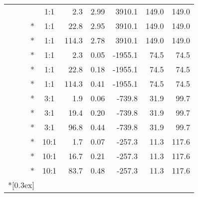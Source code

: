 \documentclass{article}
\begin{document}
\begin{center}
\begin{longtable}{rcrrrrr}
& 1:1   & 2.3   & 2.99 & 3910.1  & 149.0 & 149.0\\*
& 1:1   & 22.8  & 2.95 & 3910.1  & 149.0 & 149.0\\*
& 1:1   & 114.3 & 2.78 & 3910.1  & 149.0 & 149.0\\*
& 1:1   & 2.3   & 0.05 & -1955.1 & 74.5  & 74.5\\*
& 1:1   & 22.8  & 0.18 & -1955.1 & 74.5  & 74.5\\*
& 1:1   & 114.3 & 0.41 & -1955.1 & 74.5  & 74.5\\*
& 3:1   & 1.9   & 0.06 & -739.8  & 31.9  & 99.7\\*
& 3:1   & 19.4  & 0.20 & -739.8  & 31.9  & 99.7\\*
& 3:1   & 96.8  & 0.44 & -739.8  & 31.9  & 99.7\\*
& 10:1  & 1.7   & 0.07 & -257.3  & 11.3  & 117.6\\*
& 10:1  & 16.7  & 0.21 & -257.3  & 11.3  & 117.6\\*
& 10:1  & 83.7  & 0.48 & -257.3  & 11.3  & 117.6\\*[0.3ex]\hline \hline \\[-2ex]
\end{longtable}
\normalsize
\renewcommand{\thefootnote}{\arabic{footnote}}
\renewcommand{\arraystretch}{1.0}
\end{center}
\end{document}
